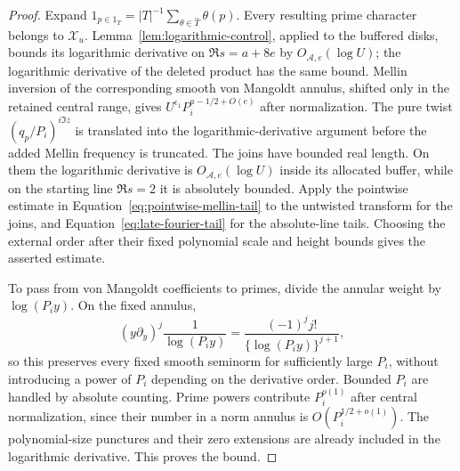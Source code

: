 \documentclass[11pt,a4paper]{article}
\numberwithin{equation}{section}
\numberwithin{figure}{section}
\theoremstyle{definition}
\theoremstyle{remark}
\begin{document}
\begin{proof}
Expand \(1_{p\in1_T}=|T|^{-1}\sum_{\theta\in\widehat T}\theta(p)\).
Every resulting prime character belongs to \(\mathcal X_u\).
Lemma~\ref{lem:logarithmic-control}, applied to the buffered disks,
bounds its logarithmic derivative on \(\Re s=a+8e\) by
\(O_{\mathcal A,e}(\log U)\); the logarithmic derivative of the
deleted product has the same bound.  Mellin inversion of the
corresponding smooth von Mangoldt annulus, shifted only in the
retained central range, gives
\(U^{\epsilon_1}P_i^{a-1/2+O(e)}\) after normalization.
The pure twist \((q_p/P_i)^{i\Im z}\) is translated into the
logarithmic-derivative argument before the added Mellin frequency
is truncated.  The joins have bounded real length.  On them the
logarithmic derivative is \(O_{\mathcal A,e}(\log U)\) inside its
allocated buffer, while on the starting line \(\Re s=2\) it is
absolutely bounded.  Apply the pointwise estimate in
Equation~\eqref{eq:pointwise-mellin-tail} to the untwisted transform
for the joins, and Equation~\eqref{eq:late-fourier-tail} for the
absolute-line tails.  Choosing the external order after their fixed
polynomial scale and height bounds gives the asserted estimate.

To pass from von Mangoldt coefficients to primes, divide the
annular weight by \(\log(P_i y)\).  On the fixed annulus,
\[
 (y\partial_y)^j\frac1{\log(P_i y)}
 =\frac{(-1)^j j!}{\{\log(P_i y)\}^{j+1}},
\]
so this preserves every fixed smooth seminorm for sufficiently
large \(P_i\), without introducing a power of \(P_i\) depending on
the derivative order.  Bounded \(P_i\) are handled by absolute
counting.  Prime powers
contribute \(P_i^{o(1)}\) after central normalization, since their
number in a norm annulus is \(O(P_i^{1/2+o(1)})\).
The polynomial-size punctures and their zero extensions are already
included in the logarithmic derivative.  This proves the bound.
\end{proof}
\end{document}

